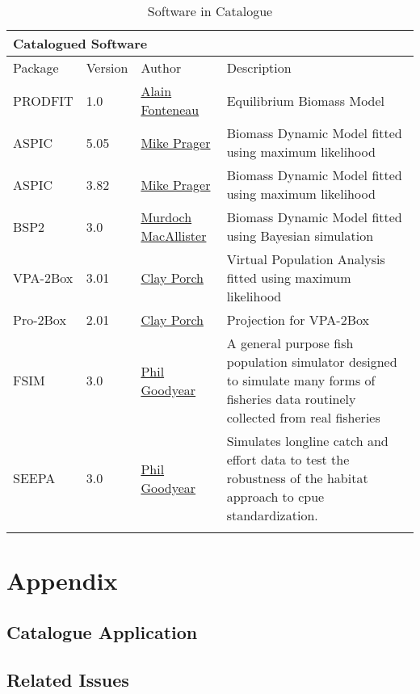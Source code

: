 \documentclass[a4paper,10pt]{article}
\begin{document}
\maketitle
\begin{table}
\caption{Software in Catalogue}
\begin{tabular}{|l|l|l| p{4cm} |} \hline
\multicolumn{4}{|l|}{\textbf{Catalogued Software}} \\ \hline
\multirow{1}{*}{Package}     & Version & Author                       & Description           \\ \hline
\multirow{1}{*}{PRODFIT}     & 1.0     &\href{}{Alain Fonteneau}      & Equilibrium Biomass  Model \\ \hline
\multirow{1}{*}{ASPIC}       & 5.05    &\href{}{Mike Prager}          & Biomass Dynamic Model fitted using maximum likelihood \\ \hline
\multirow{1}{*}{ASPIC}       & 3.82    &\href{}{Mike Prager}          & Biomass Dynamic Model fitted using maximum likelihood \\ \hline
\multirow{1}{*}{BSP2}        & 3.0     &\href{}{Murdoch MacAllister}  & Biomass Dynamic Model fitted using Bayesian simulation \\ \hline
\multirow{1}{*}{VPA-2Box}    & 3.01    &\href{}{Clay Porch}           & Virtual Population Analysis fitted using maximum likelihood\\ \hline
\multirow{1}{*}{Pro-2Box}    & 2.01    &\href{}{Clay Porch}           & Projection for VPA-2Box \\ \hline
\multirow{1}{*}{FSIM}        & 3.0     &\href{}{Phil Goodyear}        & A general purpose fish population simulator designed to simulate many forms of fisheries data routinely collected from real fisheries \\ \hline
\multirow{1}{*}{SEEPA}       & 3.0     &\href{}{Phil Goodyear}        & Simulates longline catch and effort data to test the robustness of the habitat approach to cpue standardization. \\ \hline
\label{tab:cat}
\end{tabular}
\end{table}


\newpage
\section{Appendix}
\subsection*{Catalogue Application}


\subsection*{Related Issues}

\end{document}
